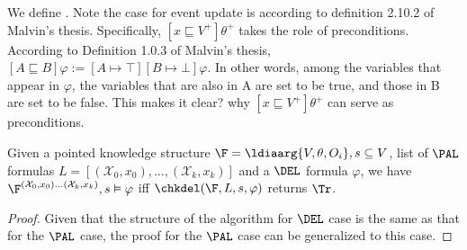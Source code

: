 \begin{defi}\label{def:alg-checkDEL}
We define . Note the case for event update is according to definition 2.10.2 of Malvin's thesis. Specifically, $[x \sqsubseteq V^+] \theta^+$ takes the role of preconditions.
According to Definition 1.0.3 of Malvin's thesis, $[A \sqsubseteq B] \varphi := [A \mapsto \top][B \mapsto \bot] \varphi$. In other words, among the variables that appear in $\varphi$, the variables that are also in A are set to be true, and those in B are set to be false. This makes it clear? why $[x \sqsubseteq V^+] \theta^+$ can serve as preconditions. 


\end{defi}


\begin{theorem}\label{thm:DELcheckCorrect}
    Given a pointed knowledge structure $\F = \ldiaarg{V,\theta,O_i},s\subseteq V$, list of $\PAL$ formulas $L = [(\mathcal{X}_0, x_0), \ldots, (\mathcal{X}_k,x_k)]$ and a $\DEL$ formula $\varphi$, we have
    $\F^{(\mathcal{X}_0, x_0) \ldots (\mathcal{X}_k,x_k)},s\vDash\varphi$ iff $\chkdel(\F,L,s,\varphi)$ returns $\Tr$.
\end{theorem}
\begin{proof}
    Given that the structure of the algorithm for $\DEL$ case is the same as that for the $\PAL$ case, the proof for the $\PAL$ case can be generalized to this case. 
\end{proof}


